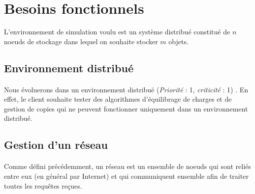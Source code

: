 \documentclass[12pt]{article}
\newcommand{\besoin}[2] {
  (\textit{Priorité} : #1, \textit{criticité} : #2)
}
\begin{document}
\newpage
\section{Besoins fonctionnels}

L'environnement de simulation voulu est un système distribué constitué de $n$ noeuds de stockage dans lequel on souhaite stocker $m$ objets.

\subsection{Environnement distribué}

\paragraph{} Nous évoluerons dans un environnement distribué \besoin{1}{1}.
En effet, le client souhaite tester des algorithmes d'équilibrage de charges et de gestion de copies qui ne peuvent fonctionner uniquement dans un environnement distribué.

	

\subsection{Gestion d'un réseau}

\paragraph{} Comme défini précédemment, un réseau est un ensemble de noeuds qui sont reliés entre eux (en général par Internet) et qui communiquent ensemble afin de traiter toutes les requêtes reçues.
\end{document}
